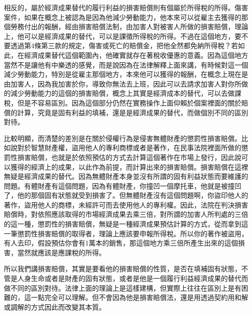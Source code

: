 \documentclass[oneside,sub3section]{ctexbook}
\begin{document}
相反的，屬於經濟成果替代的履行利益的損害賠償則有個屬於所得稅的所得。傷害案件，如果在概念上被認為是因為他減少勞動能力，他本來可以從雇主去獲得的那個勞務付出的報酬，經由損害賠償法制，由加害人對被害人所做的損害賠償，理論上，他可以是經濟成果的替代，可以是課徵所得稅的所得。不過在這個地方，要不要透過第4條第三款的規定，傷害或死亡的賠償金，把他全然都免納所得稅？若如此，在經濟成果替代這個範圍內，他確實就存在著稅收優惠的意義。因為這個地方當然不是讓他有中樂透的感覺，而是說因為在法律解釋上面來講，有時候對這一個減少勞動能力，特別是從雇主那個地方，本來他可以獲得的報酬，在概念上現在是由加害人，因為我加害於你，導致你無法去上班，因此可以去請求加害人對你所做的減少勞動能力的這個的損害賠償，概念上其實是經濟成本的替代，可以去做課稅，但是不容易區別。因為這個部分仍然在實務操作上面仰賴於個案裡面的關於賠償的計算，究竟是固有利益的填補，還是是經濟成果的替代，而做個別不同的區別對待。

比較明顯，而清楚的差別是在關於侵權行為是侵害無體財產的懲罰性損害賠償。比如說對於智慧財產權，盜用他人的專利商標或者是著作，在民事法院裡面所做的懲罰性損害賠償，也就是於依照預估的方式去計算這個著作在市場上發行，因此說可以獲得的經濟上的成果，以此作為前提，而計算出來的損害賠償。損害賠償在這裡無疑是經濟成果的替代。因為無體財產本身並沒有所謂的固有利益狀態而要維護的問題。有體財產有這個問題，因為有體財產，你撞凹一個摩托車，他就是被撞凹了，他的那個固有狀態就受到損害了。但無體財產沒有這個問題啊，你盜印他人的著作，盜用他人的商標，未經許可而去使用他人的專利權。因此，法院在判決損害賠償時，對依照應該取得的市場經濟成果去乘三倍，對所謂的加害人所判處的三倍的這一種，懲罰性的損害賠償，無疑是一種經濟成果預估計算的方式，從而拿到這一筆懲罰性損害賠償的取得者，理論上應該要申報所得稅。所以你的著作被盜用，有人去印，假設預估你會有1萬本的銷售，那這個地方乘三倍所產生出來的這個損害，當然就應該是應課稅的所得。

所以我們講損害賠償，其實是要看他的損害賠償的性質，是否在填補固有狀態，不管是人身生命或者是財產的固有狀態，或者是他是一個履行利益經濟成果的替代而做不同的區別對待。法律上面的理論上是這樣建構，但實際上往往在區別上是有困難的，這一點完全可以理解。但不會因為他是損害賠償法，還是用透過契約用和解或調解的方式因此而改變其本質。
\end{document}
